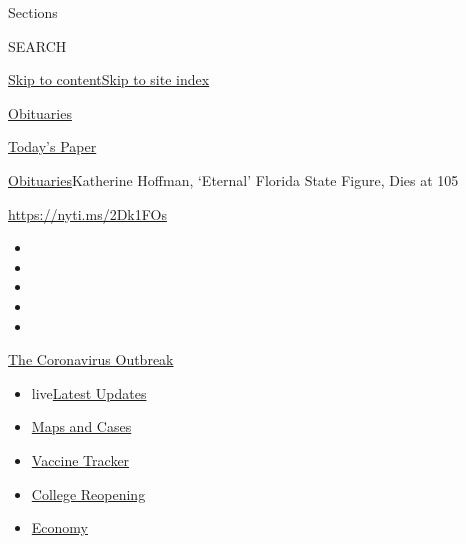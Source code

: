Sections

SEARCH

\protect\hyperlink{site-content}{Skip to
content}\protect\hyperlink{site-index}{Skip to site index}

\href{https://www.nytimes3xbfgragh.onion/section/obituaries}{Obituaries}

\href{https://myaccount.nytimes3xbfgragh.onion/auth/login?response_type=cookie\&client_id=vi}{}

\href{https://www.nytimes3xbfgragh.onion/section/todayspaper}{Today's
Paper}

\href{/section/obituaries}{Obituaries}\textbar{}Katherine Hoffman,
`Eternal' Florida State Figure, Dies at 105

\url{https://nyti.ms/2Dk1FOs}

\begin{itemize}
\item
\item
\item
\item
\item
\end{itemize}

\href{https://www.nytimes3xbfgragh.onion/news-event/coronavirus?action=click\&pgtype=Article\&state=default\&region=TOP_BANNER\&context=storylines_menu}{The
Coronavirus Outbreak}

\begin{itemize}
\tightlist
\item
  live\href{https://www.nytimes3xbfgragh.onion/2020/08/04/world/coronavirus-covid-19.html?action=click\&pgtype=Article\&state=default\&region=TOP_BANNER\&context=storylines_menu}{Latest
  Updates}
\item
  \href{https://www.nytimes3xbfgragh.onion/interactive/2020/us/coronavirus-us-cases.html?action=click\&pgtype=Article\&state=default\&region=TOP_BANNER\&context=storylines_menu}{Maps
  and Cases}
\item
  \href{https://www.nytimes3xbfgragh.onion/interactive/2020/science/coronavirus-vaccine-tracker.html?action=click\&pgtype=Article\&state=default\&region=TOP_BANNER\&context=storylines_menu}{Vaccine
  Tracker}
\item
  \href{https://www.nytimes3xbfgragh.onion/2020/08/02/us/covid-college-reopening.html?action=click\&pgtype=Article\&state=default\&region=TOP_BANNER\&context=storylines_menu}{College
  Reopening}
\item
  \href{https://www.nytimes3xbfgragh.onion/live/2020/08/03/business/stock-market-today-coronavirus?action=click\&pgtype=Article\&state=default\&region=TOP_BANNER\&context=storylines_menu}{Economy}
\end{itemize}

